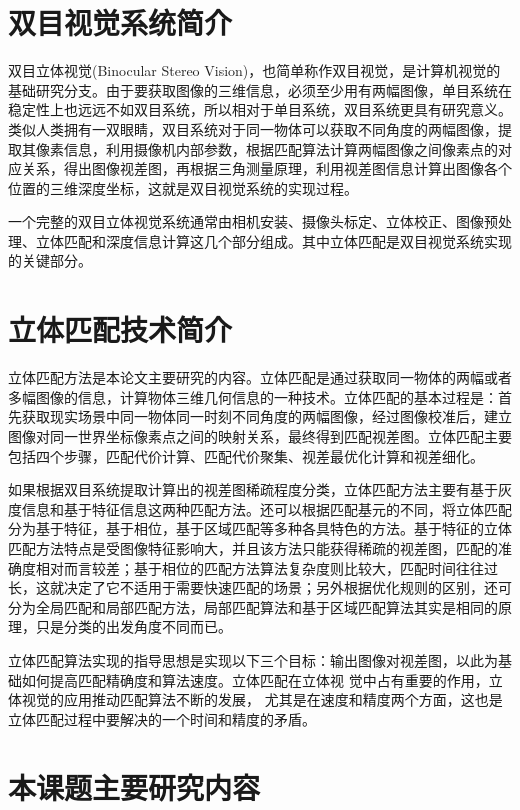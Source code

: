 \section{双目视觉系统简介}

双目立体视觉(Binocular Stereo Vision)，也简单称作双目视觉，是计算机视觉的基础研究分支。由于要获取图像的三维信息，必须至少用有两幅图像，单目系统在稳定性上也远远不如双目系统，所以相对于单目系统，双目系统更具有研究意义。类似人类拥有一双眼睛，双目系统对于同一物体可以获取不同角度的两幅图像，提取其像素信息，利用摄像机内部参数，根据匹配算法计算两幅图像之间像素点的对应关系，得出图像视差图，再根据三角测量原理，利用视差图信息计算出图像各个位置的三维深度坐标，这就是双目视觉系统的实现过程。

一个完整的双目立体视觉系统通常由相机安装、摄像头标定、立体校正、图像预处理、立体匹配和深度信息计算这几个部分组成。其中立体匹配是双目视觉系统实现的关键部分。

\section{立体匹配技术简介}

立体匹配方法是本论文主要研究的内容。立体匹配是通过获取同一物体的两幅或者多幅图像的信息，计算物体三维几何信息的一种技术。立体匹配的基本过程是：首先获取现实场景中同一物体同一时刻不同角度的两幅图像，经过图像校准后，建立图像对同一世界坐标像素点之间的映射关系，最终得到匹配视差图。立体匹配主要包括四个步骤，匹配代价计算、匹配代价聚集、视差最优化计算和视差细化。

如果根据双目系统提取计算出的视差图稀疏程度分类，立体匹配方法主要有基于灰度信息和基于特征信息这两种匹配方法。还可以根据匹配基元的不同，将立体匹配分为基于特征，基于相位，基于区域匹配等多种各具特色的方法。基于特征的立体匹配方法特点是受图像特征影响大，并且该方法只能获得稀疏的视差图，匹配的准确度相对而言较差；基于相位的匹配方法算法复杂度则比较大，匹配时间往往过长，这就决定了它不适用于需要快速匹配的场景；另外根据优化规则的区别，还可分为全局匹配和局部匹配方法，局部匹配算法和基于区域匹配算法其实是相同的原理，只是分类的出发角度不同而已。

立体匹配算法实现的指导思想是实现以下三个目标：输出图像对视差图，以此为基础如何提高匹配精确度和算法速度。立体匹配在立体视 觉中占有重要的作用，立体视觉的应用推动匹配算法不断的发展， 尤其是在速度和精度两个方面，这也是立体匹配过程中要解决的一个时间和精度的矛盾。

\section{本课题主要研究内容}

